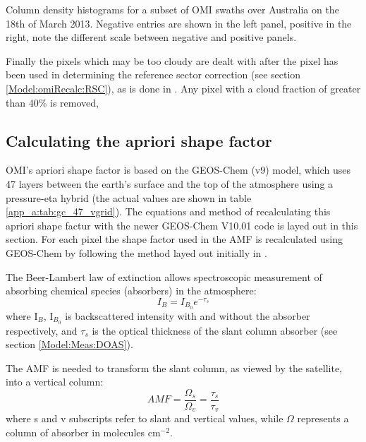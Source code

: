       {Column density histograms for a subset of OMI swaths over Australia on the 18th of March 2013.
       Negative entries are shown in the left panel, positive in the right, note the different scale between negative and positive panels.}
      {\label{Model:omiRecalc:fig_OMI_negative_hist}}
    
    Finally the pixels which may be too cloudy are dealt with after the pixel has been used in determining the reference sector correction (see section \ref{Model:omiRecalc:RSC}), as is done in \textcite{Abad2015, DeSmedt2015}.
    Any pixel with a cloud fraction of greater than 40\% is removed, 
  
  \subsection{Calculating the apriori shape factor}
    \label{Model:omiRecalc:ShapeFactor}
    OMI's apriori shape factor is based on the GEOS-Chem (v9) model, which uses 47 layers between the earth's surface and the top of the atmosphere using a pressure-eta hybrid (the actual values are shown in table \ref{app_a:tab:gc_47_vgrid}).
    The equations and method of recalculating this apriori shape factur with the newer GEOS-Chem V10.01 code is layed out in this section.
    For each pixel the shape factor used in the AMF is recalculated using GEOS-Chem by following the method layed out initially in \textcite{Palmer2001}.
    
    The Beer-Lambert law of extinction allows spectroscopic measurement of absorbing chemical species (absorbers) in the atmosphere:
    \begin{equation} \label{ch_HCHO:eqn:beerlambert}
    I_B = I_{B_0} e^{-\tau_s}
    \end{equation}
    where I$_B$, I$_{B_0}$ is backscattered intensity with and without the absorber respectively, and $\tau_s$ is the optical thickness of the slant column absorber (see section \ref{Model:Meas:DOAS}).
    
    The AMF is needed to transform the slant column, as viewed by the satellite, into a vertical column:
    \begin{equation} \label{ch_HCHO:eqn:AMFratio}
    AMF = \frac{\Omega_s}{\Omega_v} = \frac{\tau_s}{\tau_v}
    \end{equation}
    where s and v subscripts refer to slant and vertical values, while $\Omega$ represents a column of absorber in molecules cm$^{-2}$.
    
